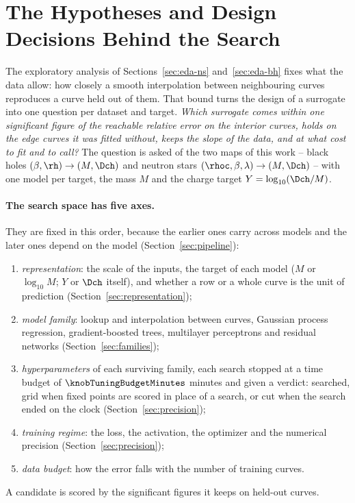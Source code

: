 \section{The Hypotheses and Design Decisions Behind the Search}
\label{sec:hypotheses}

The exploratory analysis of Sections~\ref{sec:eda-ns} and~\ref{sec:eda-bh} fixes what the data allow: how closely a smooth interpolation between neighbouring curves reproduces a curve held out of them. That bound turns the design of a surrogate into one question per dataset and target. \emph{Which surrogate comes within one significant figure of the reachable relative error on the interior curves, holds on the edge curves it was fitted without, keeps the slope of the data, and at what cost to fit and to call?} The question is asked of the two maps of this work -- black holes $(\beta, \rh) \to (M, \Dch)$ and neutron stars $(\rhoc, \beta, \lambda) \to (M, \Dch)$ -- with one model per target, the mass $M$ and the charge target $Y = \log_{10}(\Dch/M)$.

\paragraph{The search space has five axes.}
They are fixed in this order, because the earlier ones carry across models and the later ones depend on the model (Section~\ref{sec:pipeline}):
\begin{enumerate}
  \item \emph{representation}: the scale of the inputs, the target of each model ($M$ or $\log_{10} M$; $Y$ or $\Dch$ itself), and whether a row or a whole curve is the unit of prediction (Section~\ref{sec:representation});
  \item \emph{model family}: lookup and interpolation between curves, Gaussian process regression, gradient-boosted trees, multilayer perceptrons and residual networks (Section~\ref{sec:families});
  \item \emph{hyperparameters} of each surviving family, each search stopped at a time budget of $\knobTuningBudgetMinutes$ minutes and given a verdict: searched, grid when fixed points are scored in place of a search, or cut when the search ended on the clock (Section~\ref{sec:precision});
  \item \emph{training regime}: the loss, the activation, the optimizer and the numerical precision (Section~\ref{sec:precision});
  \item \emph{data budget}: how the error falls with the number of training curves.
\end{enumerate}
A candidate is scored by the significant figures it keeps on held-out curves.

